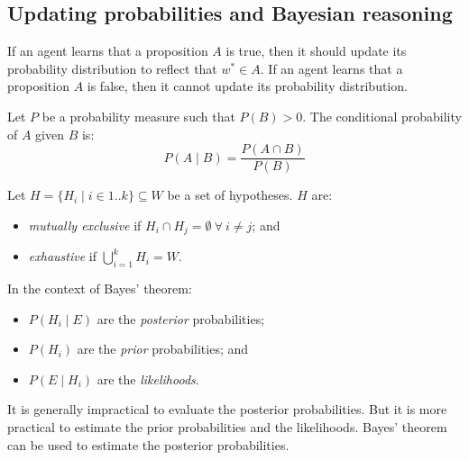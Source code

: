 \subsection{Updating probabilities and Bayesian reasoning}

If an agent learns that a proposition $A$ is true, then it should update its
probability distribution to reflect that $w^* \in A$.
If an agent learns that a proposition $A$ is false, then it cannot update its
probability distribution.

\begin{dfn}
  \label{def:2:ConditionalProbability}

  Let $P$ be a probability measure such that $P(B)>0$.
  The conditional probability of $A$ given $B$ is:
  \begin{equation}
    \label{eqn:2:ConditionalProbability}
    P(A \mid B) = \frac{P(A \cap B)}{P(B)}
  \end{equation}
\end{dfn}

Let $H = \{H_i \mid i \in 1 .. k\}\subseteq W$ be a set of
hypotheses.
$H$ are:
\begin{itemize}
  \item \textit{mutually exclusive} if $H_i \cap H_j = \emptyset\ \forall\ i \neq j$; and
  \item \textit{exhaustive} if $\bigcup_{i = 1}^{k}
          H_i = W$.
\end{itemize}
In the context of Bayes' theorem:
\begin{itemize}
  \item $P(H_i \mid E)$ are the \textit{posterior} probabilities;
  \item $P(H_i)$ are the \textit{prior} probabilities; and
  \item $P(E \mid H_i)$ are the \textit{likelihoods}.
\end{itemize}

It is generally impractical to evaluate the posterior probabilities.
But it is more practical to estimate the prior probabilities and the
likelihoods.
Bayes' theorem can be used to estimate the posterior probabilities.

